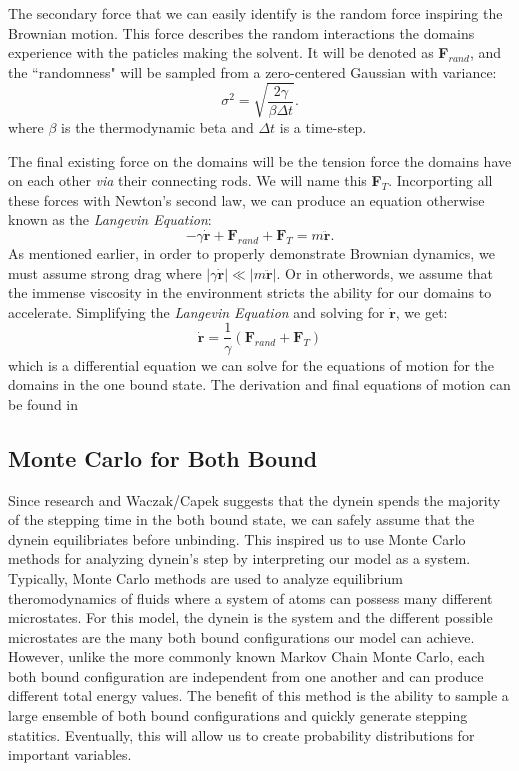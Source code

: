 The secondary force that we can easily identify is the random force inspiring the Brownian motion. This force describes the random interactions the domains experience with the paticles making the solvent. It will be denoted as \textbf{F}$_{rand}$, and the ``randomness" will be sampled from a zero-centered Gaussian with variance:
\begin{equation}
	\sigma^2=\sqrt{\frac{2\gamma}{\beta\Delta t}}.
\end{equation}
where $\beta$ is the thermodynamic beta and $\Delta t$ is a time-step. 

The final existing force on the domains will be the tension force the domains have on each other \textit{via} their connecting rods. We will name this \textbf{F}$_T$. Incorporting all these forces with Newton's second law, we can produce an equation otherwise known as the \textit{Langevin Equation}:
\begin{equation}
	-\gamma \dot{\textbf{r}} + \textbf{F}_{rand} + \textbf{F}_T = m\ddot{\textbf{r}}.
\end{equation}
As mentioned earlier, in order to properly demonstrate Brownian dynamics, we must assume strong drag where $|\gamma \dot{\textbf{r}}|\ll |m\ddot{\textbf{r}}|$. Or in otherwords, we assume that the immense viscosity in the environment stricts the ability for our domains to accelerate. Simplifying the \textit{Langevin Equation} and solving for $\dot{\textbf{r}}$, we get:
\begin{equation}
	\dot{\textbf{r}}=\frac{1}{\gamma}(\textbf{F}_{rand} + \textbf{F}_T)
\end{equation}
which is a differential equation we can solve for the equations of motion for the domains in the one bound state. The derivation and final equations of motion can be found in \cite{Capek2017, W}


\subsection{Monte Carlo for Both Bound}
Since research and Waczak/Capek suggests that the dynein spends the majority of the stepping time in the both bound state, we can safely assume that the dynein equilibriates before unbinding. This inspired us to use Monte Carlo methods for analyzing dynein's step by interpreting our model as a system. Typically, Monte Carlo methods are used to analyze equilibrium theromodynamics of fluids where a system of atoms can possess many different microstates. For this model, the dynein is the system and the different possible microstates are the many both bound configurations our model can achieve. However, unlike the more commonly known Markov Chain Monte Carlo, each both bound configuration are independent from one another and can produce different total energy values. The benefit of this method is the ability to sample a large ensemble of both bound configurations and quickly generate stepping statitics. Eventually, this will allow us to create probability distributions for important variables.

